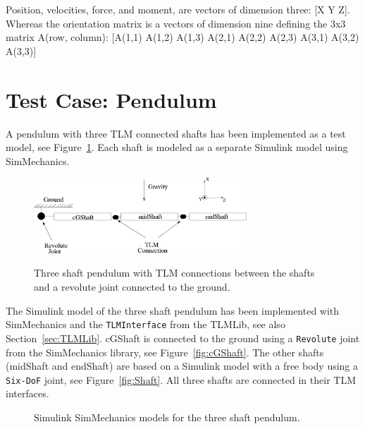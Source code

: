 Position, velocities, force, and moment, are vectors of dimension three: [X Y Z]. 
Whereas the orientation matrix is a vectors of dimension nine defining the 3x3 matrix A(row, column): [A(1,1) A(1,2) A(1,3) A(2,1) A(2,2) A(2,3) A(3,1) A(3,2) A(3,3)]


\section{Test Case: Pendulum}
A pendulum with three TLM connected shafts has been implemented as a test model, see Figure~\ref{fig:Shafts}. 
Each shaft is modeled as a separate Simulink model using SimMechanics.

\begin{figure}[ht]\begin{center}
   {\includegraphics[width=8cm]{figs/Shafts.png}}
    \caption{Three shaft pendulum with TLM connections between the
	shafts and a revolute joint connected to the ground.}
    \label{fig:Shafts}
\end{center}\end{figure}

The Simulink model of the three shaft pendulum has been implemented with SimMechanics and the {\tt TLMInterface} from the TLMLib, see also Section~\ref{sec:TLMLib}. 
cGShaft is connected to the ground using a {\tt Revolute} joint from the SimMechanics library, see Figure~\ref{fig:cGShaft}. 
The other shafts (midShaft and endShaft) are based on a Simulink model with a free body using a {\tt Six-DoF} joint, see Figure~\ref{fig:Shaft}. 
All three shafts are connected in their TLM interfaces.

\begin{figure}[ht]
\centering
{}
\caption{Simulink SimMechanics models for the three shaft pendulum.}
\label{fig:surfData}
\end{figure}

